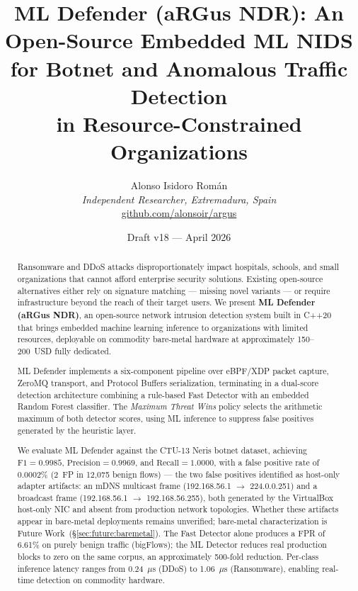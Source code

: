 \documentclass[11pt,a4paper]{article}
\title{\textbf{ML Defender (aRGus NDR): An Open-Source Embedded ML NIDS\\
for Botnet and Anomalous Traffic Detection\\
in Resource-Constrained Organizations}}
\author{
    Alonso Isidoro Rom\'an\\
    \textit{Independent Researcher, Extremadura, Spain}\\
    \href{https://github.com/alonsoir/argus}{github.com/alonsoir/argus}
}
\date{Draft v18 --- April 2026}
\begin{document}

    \maketitle

    \begin{abstract}
        Ransomware and DDoS attacks disproportionately impact hospitals, schools, and small
        organizations that cannot afford enterprise security solutions. Existing open-source
        alternatives either rely on signature matching --- missing novel variants --- or require
        infrastructure beyond the reach of their target users. We present \textbf{ML Defender
            (aRGus NDR)}, an open-source network intrusion detection system built in C++20 that brings
        embedded machine learning inference to organizations with limited resources, deployable on
        commodity bare-metal hardware at approximately 150--200~USD fully dedicated.

        ML Defender implements a six-component pipeline over eBPF/XDP packet capture, ZeroMQ
        transport, and Protocol Buffers serialization, terminating in a dual-score detection
        architecture combining a rule-based Fast Detector with an embedded Random Forest classifier.
        The \emph{Maximum Threat Wins} policy selects the arithmetic maximum of both detector scores,
        using ML inference to suppress false positives generated by the heuristic layer.

        We evaluate ML Defender against the CTU-13 Neris botnet dataset, achieving
        $\text{F1} = 0.9985$, $\text{Precision} = 0.9969$, and $\text{Recall} = 1.0000$,
        with a false positive rate of 0.0002\% (2~FP in 12,075 benign flows) --- the two false
        positives identified as host-only adapter artifacts: an mDNS multicast frame
        (192.168.56.1 $\to$ 224.0.0.251) and a broadcast frame (192.168.56.1 $\to$
        192.168.56.255), both generated by the VirtualBox host-only NIC and absent from
        production network topologies. Whether these artifacts appear in bare-metal deployments
        remains unverified; bare-metal characterization is Future Work~(\S\ref{sec:future:baremetal}).
        The Fast Detector alone produces a FPR of 6.61\% on purely benign
        traffic (bigFlows); the ML Detector reduces real production blocks to zero on the same
        corpus, an approximately 500-fold reduction. Per-class inference latency ranges from
        0.24~$\mu$s (DDoS) to 1.06~$\mu$s (Ransomware), enabling real-time detection on commodity
        hardware.


\end{abstract}
\end{document}

